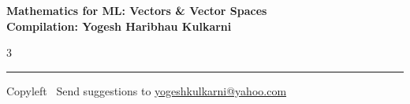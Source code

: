 \documentclass[8pt,landscape]{article}
\begin{document}
\footnotesize


\begin{center}
\Large{\textbf{Mathematics for ML: Vectors \& Vector Spaces\\ Compilation: Yogesh Haribhau Kulkarni}}
\end{center}

\begin{multicols}{3}

\end{multicols}

\rule{\linewidth}{0.25pt}
\scriptsize
Copyleft \textcopyleft\  Send suggestions to
\href{http://www.yogeshkulkarni.com}{yogeshkulkarni@yahoo.com}
\end{document}
